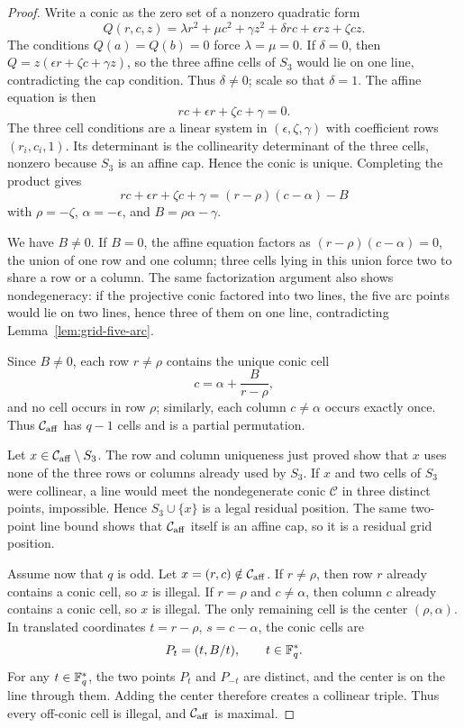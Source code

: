 \begin{proof}
Write a conic as the zero set of a nonzero quadratic form
\[
Q(r,c,z)=\lambda r^2+\mu c^2+\gamma z^2+\delta rc+\epsilon rz+\zeta cz.
\]
The conditions $Q(a)=Q(b)=0$ force $\lambda=\mu=0$. If $\delta=0$, then
$Q=z(\epsilon r+\zeta c+\gamma z)$, so the three affine cells of $S_3$ would lie on one
line, contradicting the cap condition. Thus $\delta\neq 0$; scale so that $\delta=1$.
The affine equation is then
\[
  rc+\epsilon r+\zeta c+\gamma=0.
\]
The three cell conditions are a linear system in $(\epsilon,\zeta,\gamma)$ with coefficient
rows $(r_i,c_i,1)$. Its determinant is the collinearity determinant of the three cells,
nonzero because $S_3$ is an affine cap. Hence the conic is unique. Completing the product
gives
\[
  rc+\epsilon r+\zeta c+\gamma=(r-\rho)(c-\alpha)-B
\]
with $\rho=-\zeta$, $\alpha=-\epsilon$, and $B=\rho\alpha-\gamma$.

We have $B\neq 0$. If $B=0$, the affine equation factors as
$(r-\rho)(c-\alpha)=0$, the union of one row and one column; three cells lying in this
union force two to share a row or a column. The same factorization argument also shows
nondegeneracy: if the projective conic factored into two lines, the five arc points would
lie on two lines, hence three of them on one line, contradicting
Lemma~\ref{lem:grid-five-arc}.

Since $B\neq 0$, each row $r\neq\rho$ contains the unique conic cell
\[
  c=\alpha+\frac{B}{r-\rho},
\]
and no cell occurs in row $\rho$; similarly, each column $c\neq\alpha$ occurs exactly once.
Thus $\mathcal C_{\rm aff}$ has $q-1$ cells and is a partial permutation.

Let $x\in\mathcal C_{\rm aff}\setminus S_3$. The row and column uniqueness just proved show
that $x$ uses none of the three rows or columns already used by $S_3$. If $x$ and two cells
of $S_3$ were collinear, a line would meet the nondegenerate conic $\mathcal C$ in three
distinct points, impossible. Hence $S_3\cup\{x\}$ is a legal residual position. The same
two-point line bound shows that $\mathcal C_{\rm aff}$ itself is an affine cap, so it is a
residual grid position.

Assume now that $q$ is odd. Let $x=(r,c)\notin\mathcal C_{\rm aff}$. If $r\neq\rho$, then
row $r$ already contains a conic cell, so $x$ is illegal. If $r=\rho$ and $c\neq\alpha$,
then column $c$ already contains a conic cell, so $x$ is illegal. The only remaining cell is
the center $(\rho,\alpha)$. In translated coordinates $t=r-\rho$, $s=c-\alpha$, the conic
cells are
\[
  P_t=(t,B/t),\qquad t\in\mathbb{F}_q^\ast.
\]
For any $t\in\mathbb{F}_q^\ast$, the two points $P_t$ and $P_{-t}$ are distinct, and the center is
on the line through them. Adding the center therefore creates a collinear triple. Thus
every off-conic cell is illegal, and $\mathcal C_{\rm aff}$ is maximal.
\end{proof}

